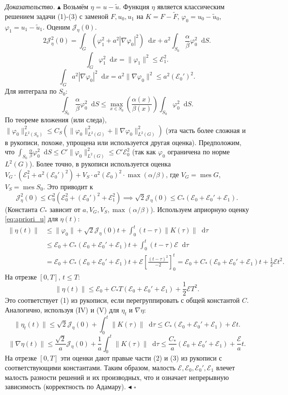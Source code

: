 \documentclass[12pt, a4paper]{article}
\newcommand{\dd}{\mathop{}\!\mathrm{d}} %
\newcommand{\mes}{\operatorname{mes}}   %
\newenvironment{proof}[1][\proofname]{\par\noindent\textit{#1.}\quad}{\hfill$\square$}
\renewcommand{\proofname}{Доказательство}
\begin{document}
\begin{proof}
$\blacktriangle$ Возьмём $\eta = u - \tilde{u}$. Функция $\eta$ является классическим решением задачи (1)-(3) с заменой $F, u_0, u_1$ на $K = F - \tilde{F}$, $\varphi_0 = u_0 - \tilde{u}_0$, $\varphi_1 = u_1 - \tilde{u}_1$.
Оценим $\mathcal{J}_\eta(0)$.
$$ 2 \mathcal{J}_\eta^2(0) = \int_G (\varphi_1^2 + a^2 |\nabla \varphi_0|^2) \dd x + a^2 \int_{S_0} \frac{\alpha}{\beta} \varphi_0^2 \dd S. $$
$$ \int_G \varphi_1^2 \dd x = \|\varphi_1\|^2 \le \mathcal{E}_1^2. $$
$$ \int_G a^2 |\nabla \varphi_0|^2 \dd x = a^2 \|\nabla \varphi_0\|^2 \le a^2 (\mathcal{E}_0')^2. $$
Для интеграла по $S_0$:
$$ \int_{S_0} \frac{\alpha}{\beta} \varphi_0^2 \dd S \le \max_{x \in S_0} \left(\frac{\alpha(x)}{\beta(x)}\right) \int_{S_0} \varphi_0^2 \dd S. $$
По теореме вложения (или следа), $\|\varphi_0\|_{L^2(S_0)}^2 \le C_S (\|\varphi_0\|_{L^2(G)}^2 + \|\nabla \varphi_0\|_{L^2(G)}^2)$ (эта часть более сложная и в рукописи, похоже, упрощена или используется другая оценка).
Предположим, что $\int_{S_0} \frac{\alpha}{\beta} \varphi_0^2 \dd S \le C' \|\varphi_0\|_{L^2(G)}^2 \le C' \mathcal{E}_0^2$ (так как $\varphi_0$ ограничена по норме $L^2(G)$).
Более точно, в рукописи используется оценка $V_G \cdot (\mathcal{E}_1^2 + a^2 (\mathcal{E}_0')^2) + V_S \cdot a^2 (\mathcal{E}_0)^2 \cdot \max (\alpha/\beta)$, где $V_G=\mes G$, $V_S=\mes S_0$.
Это приводит к
$$ \mathcal{J}_\eta^2(0) \le C_0^2 (\mathcal{E}_0^2 + (\mathcal{E}_0')^2 + \mathcal{E}_1^2) \implies \sqrt{2} \mathcal{J}_\eta(0) \le C_*( \mathcal{E}_0 + \mathcal{E}_0' + \mathcal{E}_1). $$
(Константа $C_*$ зависит от $a, V_G, V_S, \max(\alpha/\beta)$).
Используем априорную оценку \eqref{eq:apriori_u} для $\eta(t)$:
\begin{align*}
\|\eta(t)\| &\le \|\varphi_0\| + \sqrt{2} \mathcal{J}_\eta(0) t + \int_0^t (t-\tau) \|K(\tau)\| \dd\tau \\
&\le \mathcal{E}_0 + C_*(\mathcal{E}_0 + \mathcal{E}_0' + \mathcal{E}_1) t + \int_0^t (t-\tau) \mathcal{E} \dd\tau \\
&= \mathcal{E}_0 + C_*(\mathcal{E}_0 + \mathcal{E}_0' + \mathcal{E}_1) t + \mathcal{E} \left[ \frac{(t-\tau)^2}{-2} \right]_0^t = \mathcal{E}_0 + C_*(\mathcal{E}_0 + \mathcal{E}_0' + \mathcal{E}_1) t + \frac{1}{2} \mathcal{E} t^2.
\end{align*}
На отрезке $[0,T]$, $t \le T$:
$$ \|\eta(t)\| \le \mathcal{E}_0 + C_* T (\mathcal{E}_0 + \mathcal{E}_0' + \mathcal{E}_1) + \frac{1}{2} \mathcal{E} T^2. $$
Это соответствует (1) из рукописи, если перегруппировать с общей константой $C$.
Аналогично, используя (IV) и (V) для $\eta_t$ и $\nabla \eta$:
$$ \|\eta_t(t)\| \le \sqrt{2} \mathcal{J}_\eta(0) + \int_0^t \|K(\tau)\| \dd\tau \le C_*(\mathcal{E}_0 + \mathcal{E}_0' + \mathcal{E}_1) + \mathcal{E} t. $$
$$ \|\nabla \eta(t)\| \le \frac{\sqrt{2}}{a} \mathcal{J}_\eta(0) + \frac{1}{a} \int_0^t \|K(\tau)\| \dd\tau \le \frac{C_*}{a}(\mathcal{E}_0 + \mathcal{E}_0' + \mathcal{E}_1) + \frac{\mathcal{E}}{a} t. $$
На отрезке $[0,T]$ эти оценки дают правые части (2) и (3) из рукописи с соответствующими константами.
Таким образом, малость $\mathcal{E}, \mathcal{E}_0, \mathcal{E}_0', \mathcal{E}_1$ влечет малость разности решений и их производных, что и означает непрерывную зависимость (корректность по Адамару). $\blacktriangleleft$
\end{proof}
\end{document}
